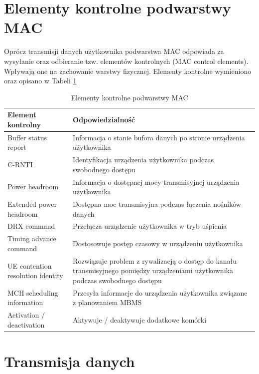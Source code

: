 \section{Elementy kontrolne podwarstwy MAC}
\label{sec:mac_control_elements}

Oprócz transmisji danych użytkownika podwarstwa MAC odpowiada za wysyłanie oraz odbieranie tzw. elementów kontrolnych (MAC control elements). Wpływają one na zachowanie warstwy fizycznej. Elementy kontrolne wymieniono oraz opisano w Tabeli \ref{tab:mac_control_elements}

\begin{center}
\begin{table}
	\begin{tabular}{ | m{8em} | m{30em} | }
		\hline
		Element kontrolny & Odpowiedzialność \\
		\hline
		Buffer status report & Informacja o stanie bufora danych po stronie urządzenia użytkownika \\
		\hline
		C-RNTI & Identyfikacja urządzenia użytkownika podczas swobodnego dostępu \\
		\hline
		Power headroom & Informacja o dostępnej mocy transmisyjnej urządzenia użytkownika \\
		\hline
		Extended power headroom & Dostępna moc transmisyjna podczas łączenia nośników danych \\
		\hline
		DRX command & Przełącza urządzenie użytkownika w tryb uśpienia \\
		\hline
		Timing advance command & Dostosowuje postęp czasowy w urządzeniu użytkownika \\
		\hline
		UE contention resolution identity & Rozwiązuje problem z rywalizacją o dostęp do kanału transmisyjnego pomiędzy urządzeniami użytkownika podczas swobodnego dostępu \\
		\hline
		MCH scheduling information & Przesyła informacje do urządzenia użytkownika związane z planowaniem MBMS \\
		\hline
		Activation / deactivation & Aktywuje / deaktywuje dodatkowe komórki \\
		\hline
	\end{tabular}
	\caption{Elementy kontrolne podwarstwy MAC}
	\label{tab:mac_control_elements}
\end{table}
\end{center}

\section{Transmisja danych}

